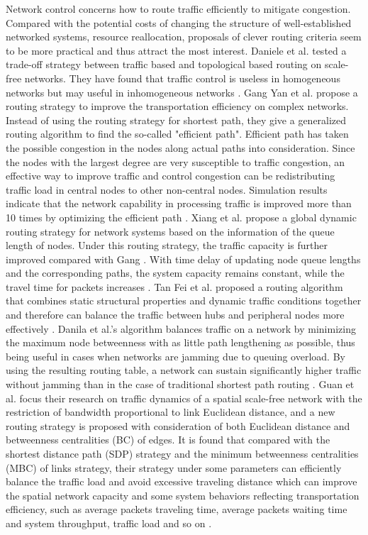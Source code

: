 \documentclass[onecolumn,preprintnumbers,amsmath,amssymb]{revtex4}
\begin{document}
Network control concerns how to route traffic efficiently to mitigate congestion.
Compared with the potential costs of changing the structure of well-established networked systems, resource reallocation, proposals of clever routing criteria seem to be more practical and thus attract the most interest.
Daniele et al. tested a trade-off strategy between traffic based and topological based routing on scale-free networks.
They have found that traffic control is useless in homogeneous networks but may useful in inhomogeneous networks \cite{DDL}. 
Gang Yan et al. propose a routing strategy to improve the transportation efficiency on complex networks. 
Instead of using the routing strategy for shortest path, they give a generalized routing algorithm to find the so-called "efficient path".
Efficient path has taken the possible congestion in the nodes along actual paths into consideration. 
Since the nodes with the largest degree are very susceptible to traffic congestion, an effective way to improve traffic and control congestion can be redistributing traffic load in central nodes to other non-central nodes.
Simulation results indicate that the network capability in processing traffic is improved more than 10 times by optimizing the efficient path \cite{GYT}.
Xiang et al. propose a global dynamic routing strategy for network systems based on the information of the queue length of nodes. 
Under this routing strategy, the traffic capacity is further improved compared with Gang \cite{GYT}. 
With time delay of updating node queue lengths and the corresponding paths, the system capacity remains constant, while the travel time for packets increases \cite{XLM}.
Tan Fei et al. proposed a routing algorithm that combines static structural properties and dynamic traffic conditions together and therefore can balance the traffic between hubs and peripheral nodes more effectively \cite{FTY}.
Danila et al.'s algorithm balances traffic on a network by minimizing the maximum node betweenness with as little path lengthening as possible, thus being useful in cases when networks are jamming due to queuing overload. 
By using the resulting routing table, a network can sustain significantly higher traffic without jamming than in the case of traditional shortest path routing \cite{BDY}.
Guan et al. focus their research on traffic dynamics of a spatial scale-free network with the restriction of bandwidth proportional to link Euclidean distance, and a new routing strategy is proposed with consideration of both Euclidean distance and betweenness centralities (BC) of edges. 
It is found that compared with the shortest distance path (SDP) strategy and the minimum betweenness centralities (MBC) of links strategy, their strategy under some parameters can efficiently balance the traffic load and avoid excessive traveling distance which can improve the spatial network capacity and some system behaviors reflecting transportation efficiency, such as average packets traveling time, average packets waiting time and system throughput, traffic load and so on \cite{XLMD}.
\end{document}
